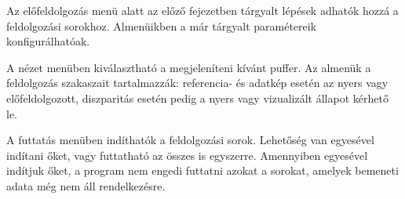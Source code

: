 Az előfeldolgozás menü alatt az előző fejezetben tárgyalt lépések adhatók hozzá a feldolgozási sorokhoz.
Almenüikben a már tárgyalt paramétereik konfigurálhatóak.

A nézet menüben kiválasztható a megjeleníteni kívánt puffer.
Az almenük a feldolgozás szakaszait tartalmazzák: referencia- és adatkép esetén az nyers vagy előfeldolgozott, diszparitás esetén pedig a nyers vagy vizualizált állapot kérhető le.

A futtatás menüben indíthatók a feldolgozási sorok.
Lehetőség van egyesével indítani őket, vagy futtatható az összes is egyszerre.
Amennyiben egyesével indítjuk őket, a program nem engedi futtatni azokat a sorokat, amelyek bemeneti adata még nem áll rendelkezésre.
